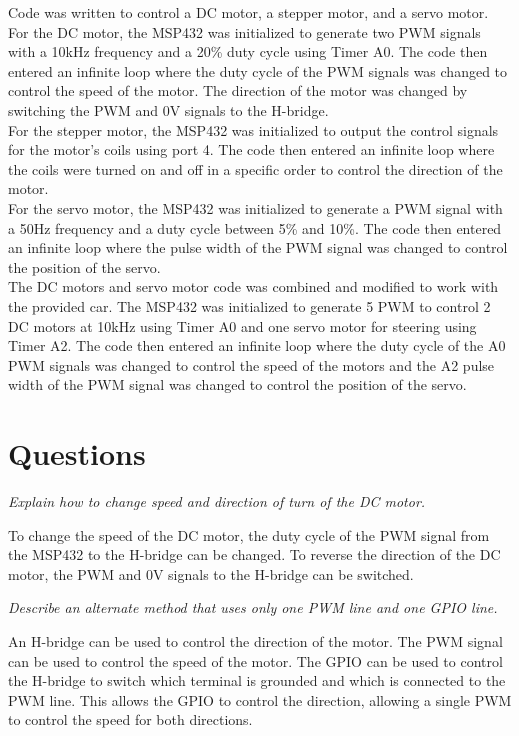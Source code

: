 \documentclass[CMPE]{KGCOEReport}
\begin{document}
Code was written to control a DC motor, a stepper motor, and a servo motor. For the DC motor, the MSP432 was initialized to generate two PWM signals with a 10kHz frequency and a 20\% duty cycle using Timer A0. The code then entered an infinite loop where the duty cycle of the PWM signals was changed to control the speed of the motor. The direction of the motor was changed by switching the PWM and 0V signals to the H-bridge.\\
For the stepper motor, the MSP432 was initialized to output the control signals for the motor's coils using port 4. The code then entered an infinite loop where the coils were turned on and off in a specific order to control the direction of the motor.\\
For the servo motor, the MSP432 was initialized to generate a PWM signal with a 50Hz frequency and a duty cycle between 5\% and 10\%. The code then entered an infinite loop where the pulse width of the PWM signal was changed to control the position of the servo.\\
The DC motors and servo motor code was combined and modified to work with the provided car. The MSP432 was initialized to generate 5 PWM to control 2 DC motors at 10kHz using Timer A0 and one servo motor for steering using Timer A2. The code then entered an infinite loop where the duty cycle of the A0 PWM signals was changed to control the speed of the motors and the A2 pulse width of the PWM signal was changed to control the position of the servo.\\

\section*{Questions}

\emph{Explain how to change speed and direction of turn of the DC motor.}

To change the speed of the DC motor, the duty cycle of the PWM signal from the MSP432 to the H-bridge can be changed. To reverse the direction of the DC motor, the PWM and 0V signals to the H-bridge can be switched.

\bigskip

\emph{Describe an alternate method that uses only one PWM line and one GPIO line.}

An H-bridge can be used to control the direction of the motor. The PWM signal can be used to control the speed of the motor. The GPIO can be used to control the H-bridge to switch which terminal is grounded and which is connected to the PWM line. This allows the GPIO to control the direction, allowing a single PWM to control the speed for both directions.
\end{document}
